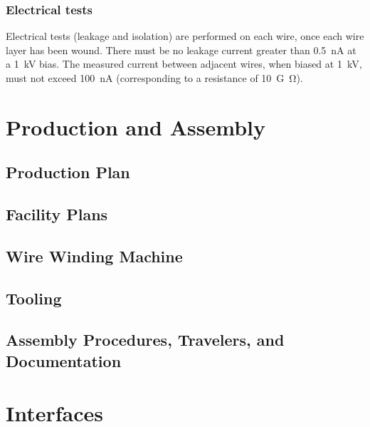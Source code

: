 \subsubsection{Electrical tests}

Electrical tests (leakage and isolation) are performed on each wire, once each wire layer has been wound. There must be no leakage current greater than \SI{0.5}{nA} at a \SI{1}{kV} bias. The measured current between adjacent wires, when biased at \SI{1}{kV}, must not exceed \SI{100}{nA} (corresponding to a resistance of \SI{10}{G\ohm}).


\section{Production and Assembly}
\label{sec:fdsp-apa-prod-assy}


\subsection{Production Plan}
\label{sec:fdsp-apa-prod-plan}


\subsection{Facility Plans}
\label{sec:fdsp-apa-facility}


\subsection{Wire Winding Machine}
\label{sec:fdsp-apa-winding}


\subsection{Tooling}
\label{sec:fdsp-apa-tooling}


\subsection{Assembly Procedures, Travelers, and Documentation}
\label{sec:fdsp-apa-assy}




\section{Interfaces}
\label{sec:fdsp-apa-intfc}

